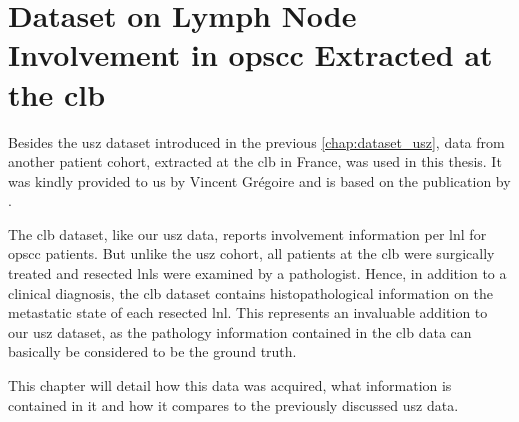 \documentclass[\relativeRoot/main.tex]{subfiles}
\begin{document}
\chapter[
    CLB Dataset on Lymph Node Involvement in OPSCC
]{
    Dataset on Lymph Node Involvement in \acrlong{opscc} Extracted at the \gls{clb}
}
\label{chap:dataset_clb}

Besides the \gls{usz} dataset introduced in the previous \cref{chap:dataset_usz}, data from another patient cohort, extracted at the \gls{clb} in France, was used in this thesis. It was kindly provided to us by Vincent Grégoire and is based on the publication by .

The \gls{clb} dataset, like our \gls{usz} data, reports involvement information per \gls{lnl} for \gls{opscc} patients. But unlike the \gls{usz} cohort, all patients at the \gls{clb} were surgically treated and resected \glspl{lnl} were examined by a pathologist. Hence, in addition to a clinical diagnosis, the \gls{clb} dataset contains histopathological information on the metastatic state of each resected \gls{lnl}. This represents an invaluable addition to our \gls{usz} dataset, as the pathology information contained in the \gls{clb} data can basically be considered to be the ground truth.

This chapter will detail how this data was acquired, what information is contained in it and how it compares to the previously discussed \gls{usz} data.







\end{document}
